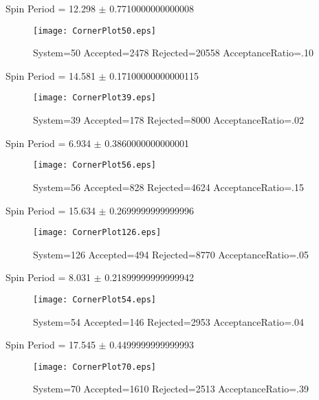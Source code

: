 \documentclass[10pt]{article}
\begin{document}
\newpage
\begin{center}
        Spin Period = 12.298 $\pm$ 0.7710000000000008
        \end{center}
\begin{figure}[H] 
        \texttt{[image: CornerPlot50.eps]}
        \caption{System=50 Accepted=2478 Rejected=20558 AcceptanceRatio=.10}
        \label{S50}
        \centering
        \end{figure}
\newpage
\begin{center}
        Spin Period = 14.581 $\pm$ 0.17100000000000115
        \end{center}
\begin{figure}[H] 
        \texttt{[image: CornerPlot39.eps]}
        \caption{System=39 Accepted=178 Rejected=8000 AcceptanceRatio=.02}
        \label{S39}
        \centering
        \end{figure}
\newpage
\begin{center}
        Spin Period = 6.934 $\pm$ 0.3860000000000001
        \end{center}
\begin{figure}[H] 
        \texttt{[image: CornerPlot56.eps]}
        \caption{System=56 Accepted=828 Rejected=4624 AcceptanceRatio=.15}
        \label{S56}
        \centering
        \end{figure}
\newpage
\begin{center}
        Spin Period = 15.634 $\pm$ 0.2699999999999996
        \end{center}
\begin{figure}[H] 
        \texttt{[image: CornerPlot126.eps]}
        \caption{System=126 Accepted=494 Rejected=8770 AcceptanceRatio=.05}
        \label{S126}
        \centering
        \end{figure}
\newpage
\begin{center}
        Spin Period = 8.031 $\pm$ 0.21899999999999942
        \end{center}
\begin{figure}[H] 
        \texttt{[image: CornerPlot54.eps]}
        \caption{System=54 Accepted=146 Rejected=2953 AcceptanceRatio=.04}
        \label{S54}
        \centering
        \end{figure}
\newpage
\begin{center}
        Spin Period = 17.545 $\pm$ 0.4499999999999993
        \end{center}
\begin{figure}[H] 
        \texttt{[image: CornerPlot70.eps]}
        \caption{System=70 Accepted=1610 Rejected=2513 AcceptanceRatio=.39}
        \label{S70}
        \centering
        \end{figure}
\end{document}
